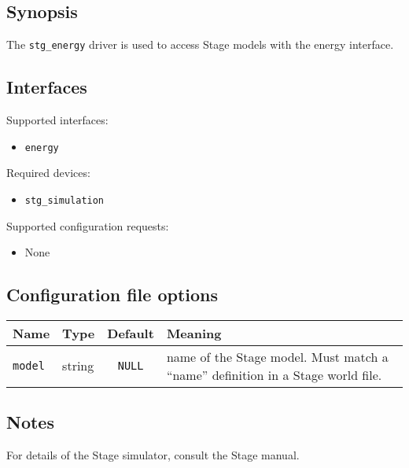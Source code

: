 \subsection*{Synopsis}

The {\tt stg\_energy} driver is used to access Stage models with the
energy interface.

\subsection*{Interfaces}

\noindent Supported interfaces:
\begin{itemize}
\item {\tt energy}
\end{itemize}

\noindent Required devices:
\begin{itemize}
\item  {\tt stg\_simulation}
\end{itemize}

\noindent Supported configuration requests:
\begin{itemize}
\item None
\end{itemize}


\subsection*{Configuration file options}

\begin{center}
{\small \begin{tabularx}{\columnwidth}{|l|l|c|X|}
\hline
Name & Type & Default & Meaning\\
\hline
{\tt model} & string & {\tt NULL} & name of the Stage model. Must match a ``name'' definition in a Stage world file. \\
\hline
\end{tabularx}}
\end{center}

\subsection*{Notes}

For details of the Stage simulator, consult the Stage manual.

